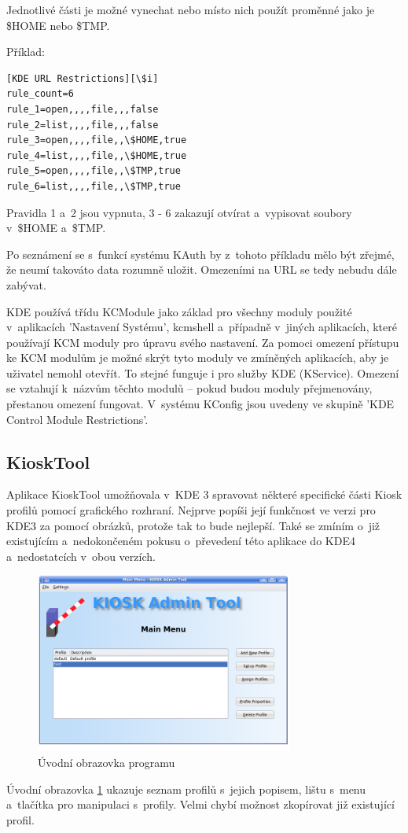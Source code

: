 Jednotlivé části je možné vynechat nebo místo nich použít proměnné jako
je \$HOME nebo \$TMP.

Příklad:
\begin{verbatim}
[KDE URL Restrictions][\$i]
rule_count=6
rule_1=open,,,,file,,,false
rule_2=list,,,,file,,,false
rule_3=open,,,,file,,\$HOME,true
rule_4=list,,,,file,,\$HOME,true
rule_5=open,,,,file,,\$TMP,true
rule_6=list,,,,file,,\$TMP,true
\end{verbatim}

Pravidla 1 a~2 jsou vypnuta, 3 - 6 zakazují otvírat a~vypisovat soubory
v~\$HOME a~\$TMP.

Po seznámení se s~funkcí systému KAuth by z~tohoto příkladu mělo být zřejmé, že
neumí takováto data rozumně uložit. Omezeními na URL se tedy nebudu dále
zabývat.

KDE používá třídu KCModule jako základ pro všechny moduly použité v~aplikacích
'Nastavení Systému', kcmshell a~případně v~jiných aplikacích, které používají
KCM moduly pro úpravu svého nastavení. Za pomoci omezení přístupu ke KCM modulům
je možné skrýt tyto moduly ve zmíněných aplikacích, aby je uživatel nemohl 
otevřít. To stejné funguje i pro služby KDE (KService). Omezení se vztahují
k~názvům těchto modulů -- pokud budou moduly přejmenovány, přestanou omezení
fungovat. V~systému KConfig jsou uvedeny ve skupině 'KDE Control Module Restrictions'.

\subsection{KioskTool}
Aplikace KioskTool umožňovala v~KDE 3 spravovat některé specifické části Kiosk
profilů pomocí grafického rozhraní. Nejprve popíši její funkčnost ve verzi pro
KDE3 za pomocí obrázků, protože tak to bude nejlepší. Také se zmíním
o~již existujícím a~nedokončeném pokusu o~převedení této aplikace do KDE4
a~nedostatcích v~obou verzích. 

\begin{figure}[h]
    \centering
    \includegraphics[width=8.5cm]{obrazky/KioskToolKDE3/uvodni_obrazovka.png}
    \caption{Úvodní obrazovka programu}
    \label{fig:kt3_uvodni}
\end{figure}
Úvodní obrazovka \ref{fig:kt3_uvodni} ukazuje seznam profilů s~jejich popisem,
lištu s~menu a~tlačítka pro manipulaci s~profily. Velmi chybí možnost zkopírovat
již existující profil.

